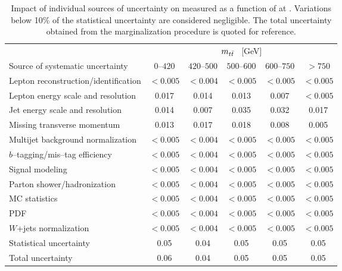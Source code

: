 
\begin{table}[!htbp]\centering
\begin{tabular}{l c c c c c}
\toprule
 &\multicolumn{5}{c}{$m_{t\bar{t}}{}$ ~[GeV]} \\
Source of systematic uncertainty           &         $0$--$420$ & $420$--$500$      & $500$--$600$         & $600$--$750$      &   $>750$ \\
\midrule
Lepton reconstruction/identification              & $<0.005$ & $<0.004$ & $<0.005$ & $<0.005$ & $<0.005$  \\
Lepton energy scale and resolution                & 0.017 & 0.014 & 0.013 & 0.007 & $<0.005$ \\
Jet energy scale and resolution                   & 0.014 & 0.007 & 0.035 & 0.032 & 0.017 \\
Missing transverse momentum & 0.013 & 0.017 & 0.018 & 0.008 & 0.005 \\
Multijet background normalization    & $<0.005$ & $<0.004$ & $<0.005$ & $<0.005$ & $<0.005$ \\
$b$--tagging/mis--tag efficiency                & $<0.005$ & $<0.004$ & $<0.005$ & $<0.005$ & $<0.005$ \\
Signal modeling                        & $<0.005$ & $<0.004$ & $<0.005$ & $<0.005$ & $<0.005$ \\
Parton shower/hadronization             & $<0.005$ & $<0.004$ & $<0.005$ & $<0.005$ & $<0.005$ \\
MC statistics                 & $<0.005$ & $<0.004$ & $<0.005$ & $<0.005$ & $<0.005$ \\
PDF                                     & $<0.005$ & $<0.004$ & $<0.005$ & $<0.005$ & $<0.005$ \\
$W$+jets normalization        & $<0.005$ & $<0.004$ & $<0.005$ & $<0.005$ & $<0.005$ \\
\midrule
Statistical uncertainty                    & 0.05 &        0.04 &        0.05  &       0.05   &   0.05    \\
\midrule
Total uncertainty                    & 0.06 &        0.04 &        0.05  &       0.05   &   0.05    \\
\bottomrule
\end{tabular}
\caption{Impact of individual sources of uncertainty on
  \ac{} measured as a function of \mtt{} at \seventev{}. Variations below 10\%
  of the statistical uncertainty are considered negligible. The total uncertainty obtained from the
  marginalization procedure is quoted for reference.}
\label{table:Systematics_mtt}
\end{table}

